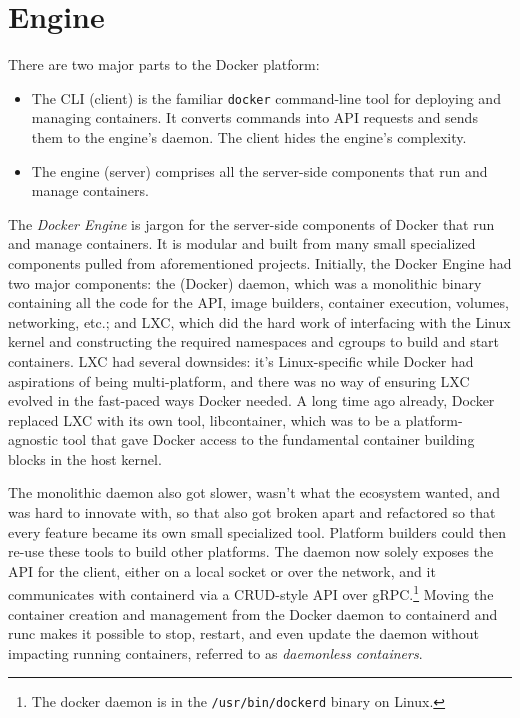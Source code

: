 \documentclass[8pt, table, xcdraw]{article}%
\begin{document}
\section{Engine}

There are two major parts to the Docker platform:

\begin{itemize}
    \item The CLI (client) is the familiar \texttt{docker} command-line tool for deploying and managing containers. It converts commands into API requests and sends them to the engine's daemon. The client hides the engine's complexity.
    \item The engine (server) comprises all the server-side components that run and manage containers.
\end{itemize}

The \emph{Docker Engine} is jargon for the server-side components of Docker that run and manage containers. It is modular and built from many small specialized components pulled from aforementioned projects. Initially, the Docker Engine had two major components: the (Docker) daemon, which was a monolithic binary containing all the code for the API, image builders, container execution, volumes, networking, etc.; and LXC, which did the hard work of interfacing with the Linux kernel and constructing the required namespaces and cgroups to build and start containers. LXC had several downsides: it's Linux-specific while Docker had aspirations of being multi-platform, and there was no way of ensuring LXC evolved in the fast-paced ways Docker needed. A long time ago already, Docker replaced LXC with its own tool, libcontainer, which was to be a platform- agnostic tool that gave Docker access to the fundamental container building blocks in the host kernel.

The monolithic daemon also got slower, wasn’t what the ecosystem wanted, and was hard to innovate with, so that also got broken apart and refactored so that every feature became its own small specialized tool. Platform builders could then re-use these tools to build other platforms. The daemon now solely exposes the API for the client, either on a local socket or over the network, and it communicates with containerd via a CRUD-style API over gRPC.\footnote{The docker daemon is in the \lstinline{/usr/bin/dockerd} binary on Linux.} Moving the container creation and management from the Docker daemon to containerd and runc makes it possible to stop, restart, and even update the daemon without impacting running containers, referred to as \emph{daemonless containers}.
\end{document}
